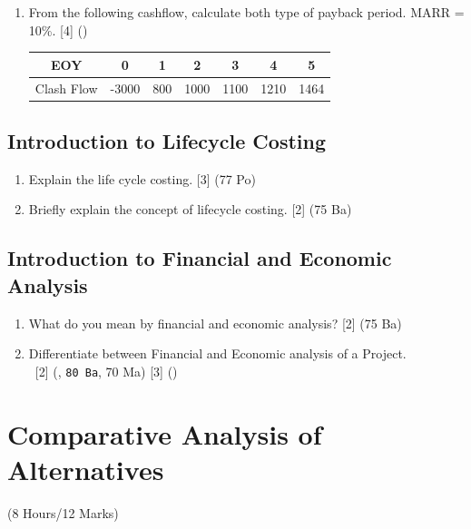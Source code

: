 \documentclass[12pt]{article}
\newcommand{\enter}{\\\textcolor{white}{1}}
\begin{document}
\begin{enumerate}
			\item From the following cashflow, calculate both type of payback period. MARR = 10\%. \hfill [4] ()
			\begin{tabular}{|c|c|c|c|c|c|c|}
				\hline
				EOY & 0 & 1 & 2 & 3 & 4 & 5\\ \hline
				Clash Flow & -3000 & 800 & 1000 & 1100 & 1210 & 1464\\ 
				\hline
			\end{tabular}
			\end{enumerate}

	\subsection{Introduction to Lifecycle Costing}
		\begin{enumerate}[noitemsep, topsep = 0pt]	
			\item Explain the life cycle costing. \hfill [3] (77 Po)
			
			\item Briefly explain the concept of lifecycle costing. \hfill [2] (75 Ba)
		\end{enumerate}

	\subsection{Introduction to Financial and Economic Analysis}
		\begin{enumerate}[noitemsep, topsep = 0pt]
			\item What do you mean by financial and economic analysis? \hfill [2] (75 Ba)

			\item Differentiate between Financial and Economic analysis of a Project.
			\enter\hfill [2] (, \texttt{80 Ba}, 70 Ma) [3] ()
		\end{enumerate}

	\pagebreak
\section{Comparative Analysis of Alternatives}
	\begin{center}(8 Hours/12 Marks)\end{center}
\end{document}
